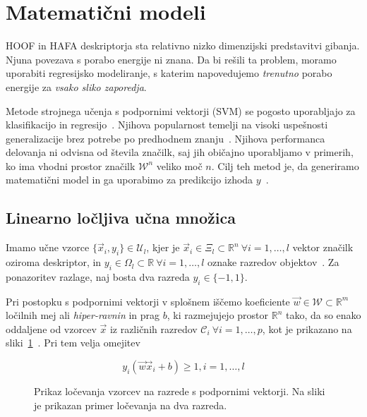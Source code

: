 \section{Matematični modeli}\label{sec:matematicni-modeli}
HOOF in HAFA deskriptorja sta relativno nizko dimenzijski predstavitvi gibanja. Njuna povezava s porabo energije ni znana. Da bi rešili ta problem, moramo uporabiti regresijsko modeliranje, s katerim napovedujemo \emph{trenutno} porabo energije za \emph{vsako sliko zaporedja}.

Metode strojnega učenja s podpornimi vektorji (SVM) se pogosto uporabljajo za klasifikacijo in regresijo~\cite{chang2011a}. Njihova popularnost temelji na visoki uspešnosti generalizacije brez potrebe po predhodnem znanju~\cite{chapelle1999support}. Njihova performanca delovanja ni odvisna od števila značilk, saj jih običajno uporabljamo v primerih, ko ima vhodni prostor značilk $\mathcal{W}^n$ veliko moč $n$. Cilj teh metod je, da generiramo matematični model in ga uporabimo za predikcijo izhoda $y$~\cite{hsu2003practical}. 






\subsection{Linearno ločljiva učna množica}
Imamo učne vzorce $\{ \vec{x}_i, y_i \} \in \mathcal{U}_l$, kjer je $\vec{x}_i \in \mathcal{\Xi}_l \subset \mathbb{R}^n~\forall i = 1, \ldots, l$ vektor značilk oziroma deskriptor, in $y_i \in \mathit{\Omega}_l \subset \mathbb{R}~\forall i = 1, \ldots, l$ oznake razredov objektov~\cite{chapelle1999support}. Za ponazoritev razlage, naj bosta dva razreda $y_i \in \{-1,1\}$. 

Pri postopku s podpornimi vektorji v splošnem iščemo koeficiente \hbox{$\vec{w}\in\mathcal{W}\subset\mathbb{R}^m$} ločilnih mej ali \emph{hiper-ravnin} in prag $b$, ki razmejujejo prostor $\mathbb{R}^n$ tako, da so enako oddaljene od vzorcev $\vec{x}$ iz različnih razredov $\mathcal{C}_i~\forall i= 1, \ldots, p$, kot je prikazano na sliki~\ref{fig:svm-locljivo}~\cite{chapelle1999support}. Pri tem velja omejitev

\begin{equation}\label{eq:omejitev-ravnine}
	y_i(\vec{w} \vec{x}_i + b) \geq 1, i=1, \ldots, l
\end{equation}





\begin{figure}[htb]
\centering

\caption[Prikaz ločevanja vzorcev na razrede s podpornimi vektorji]{Prikaz ločevanja vzorcev na razrede s podpornimi vektorji. Na sliki je prikazan primer ločevanja na dva razreda.}
\label{fig:svm-locljivo}
\end{figure}




